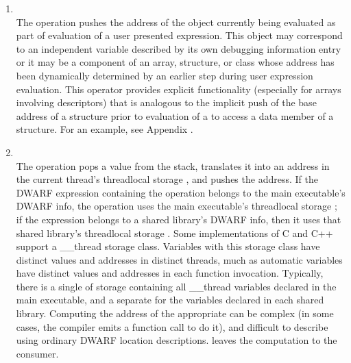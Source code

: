 \begin{enumerate}[1]
\item {}\\
The  operation pushes the address
of the object currently being evaluated as part of evaluation
of a user presented expression. This object may correspond
to an independent variable described by its own debugging
information entry or it may be a component of an array,
structure, or class whose address has been dynamically
determined by an earlier step during user expression
evaluation.  This operator provides explicit functionality
(especially for arrays involving descriptors) that is analogous
to the implicit push of the base address of a structure prior
to evaluation of a  to access a
data member of a structure. For an example, see 
Appendix .

\item {} \\
The  operation pops a value from the
stack, translates it into an address in the current thread's
thread\dash local storage , and pushes the address. If the
DWARF expression containing 
the 
operation belongs to the main executable's DWARF info, the
operation uses the main executable's thread\dash local storage
; if the expression belongs to a shared library's
DWARF info, then it uses that shared library's thread\dash local
storage .  Some implementations of C and C++ support a
\_\_thread storage class. Variables with this storage class
have distinct values and addresses in distinct threads, much
as automatic variables have distinct values and addresses in
each function invocation. Typically, there is a single 
of storage containing all \_\_thread variables declared in
the main executable, and a separate  for the variables
declared in each shared library. Computing the address of
the appropriate  can be complex (in some cases, the
compiler emits a function call to do it), and difficult
to describe using ordinary DWARF location descriptions.
 leaves the computation to the
consumer.


\end{enumerate}
